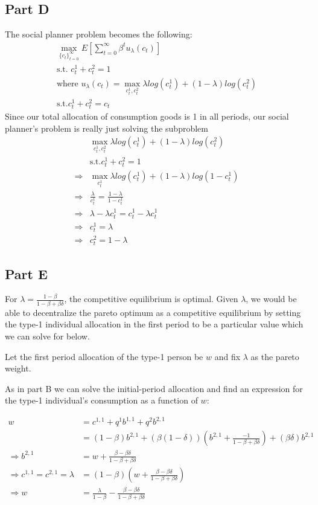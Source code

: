 \documentclass[11pt]{article} %
\begin{document}
\subsection{Part D}
The social planner problem becomes the following:
\begin{align*}
\max_{\{c_t\}_{t=0}^{\infty}}E\left[ \sum_{t=0}^{\infty} \beta^t u_{\lambda}(c_t) \right]\\
\text{s.t. } c^{1}_t + c^{2}_t = 1 \\
\text{where } u_{\lambda}(c_t) = \max_{c_t^1,c_t^2} \lambda log(c_t^1) + (1-\lambda)log(c_t^2)\\
\text{s.t.} c_t^1+ c_t^2 = c_t
\end{align*}
Since our total allocation of consumption goods is 1 in all periods, our social planner's problem is really just solving the subproblem
\begin{align*}
&\max_{c_t^1,c_t^2} \lambda log(c_t^1) + (1-\lambda)log(c_t^2) \\
&\text{s.t.} c_t^1+ c_t^2 = 1\\
\Rightarrow  &\max_{c_t^1} \lambda log(c_t^1) + (1-\lambda)log(1-c_t^1) \\
\Rightarrow &\frac{\lambda}{c_t^1} = \frac{1-\lambda}{1-c_t^1} \\
\Rightarrow &\lambda - \lambda c_t^1 = c_t^1 - \lambda c_t^1\\
\Rightarrow &c_t^1 = \lambda\\
\Rightarrow &c_t^2 = 1-\lambda
\end{align*}
\subsection{Part E}
For $\lambda = \frac{1-\beta}{1-\beta + \beta\delta}$, the competitive equilibrium is optimal. Given $\lambda$, we would be able to decentralize the pareto optimum as a competitive equilibrium by setting the type-1 individual allocation in the first period to be a particular value which we can solve for below.

Let the first period allocation of the type-1 person be $w$ and fix $\lambda$ as the pareto weight.

As in part B we can solve the initial-period allocation and find an expression for the type-1 individual's consumption as a function of $w$:

\begin{align*}
w &= c^{1,1} + q^1b^{1,1} + q^2b^{2,1}\\
 &= (1-\beta)b^{2,1} + ( \beta(1-\delta))\left( b^{2,1}+\frac{-1}{1-\beta + \beta \delta}\right) + (\beta\delta)b^{2,1}\\
\Rightarrow  b^{2,1} &= w + \frac{\beta - \beta\delta}{1-\beta + \beta\delta}\\
 \Rightarrow c^{1,1} = c^{2,1} = \lambda &= (1-\beta)\left( w + \frac{\beta - \beta\delta}{1-\beta + \beta\delta}\right)\\
\Rightarrow w &= \frac{\lambda}{1-\beta} -  \frac{\beta - \beta\delta}{1-\beta + \beta\delta}
\end{align*}
\end{document}
